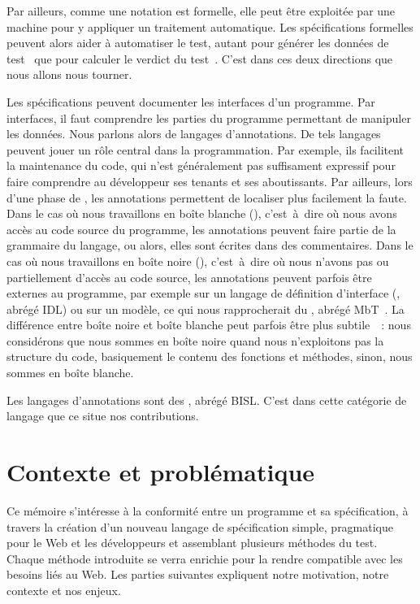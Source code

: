 Par ailleurs, comme une notation est formelle, elle peut être exploitée par une
machine pour y appliquer un traitement automatique. Les spécifications
formelles peuvent alors aider à {\strong automatiser le test}, autant pour
générer les données de test~
que pour calculer le verdict du test~. C'est dans ces deux
directions que nous allons nous tourner.

Les spécifications peuvent documenter les {\strong interfaces} d'un programme.
Par interfaces, il faut comprendre les parties du programme permettant de
manipuler les données. Nous parlons alors de {\strong langages d'annotations}.
De tels langages peuvent jouer un rôle central dans la programmation. Par
exemple, ils facilitent la maintenance du code, qui n'est généralement pas
suffisament expressif pour faire comprendre au développeur ses tenants et ses
aboutissants. Par ailleurs, lors d'une phase de , les
annotations permettent de localiser plus facilement la faute. Dans le cas où
nous travaillons en boîte blanche (), c'est~à~dire où nous
avons accès au code source du programme, les annotations peuvent faire partie de
la grammaire du langage, ou alors, elles sont écrites dans des {\strong
commentaires}. Dans le cas où nous travaillons en boîte noire
(), c'est~à~dire où nous n'avons pas ou partiellement
d'accès au code source, les annotations peuvent parfois être externes au
programme, par exemple sur un langage de définition d'interface
(, abrégé IDL) ou sur un modèle, ce qui
nous rapprocherait du , abrégé
MbT~. La différence entre boîte noire et boîte blanche peut
parfois être plus subtile~~: nous considérons que nous sommes en
boîte noire quand nous n'exploitons pas la structure du code, basiquement le
contenu des fonctions et méthodes, sinon, nous sommes en boîte blanche.

Les langages d'annotations sont des , abrégé BISL. C'est dans cette catégorie de langage que
ce situe nos contributions.

\section{Contexte et problématique}

Ce mémoire s'intéresse à la conformité entre un programme et sa spécification, à
travers la création d'un nouveau langage de spécification simple, pragmatique
pour le Web et les développeurs et assemblant plusieurs méthodes du test. Chaque
méthode introduite se verra enrichie pour la rendre compatible avec les besoins
liés au Web. Les parties suivantes expliquent notre motivation, notre contexte
et nos enjeux.

